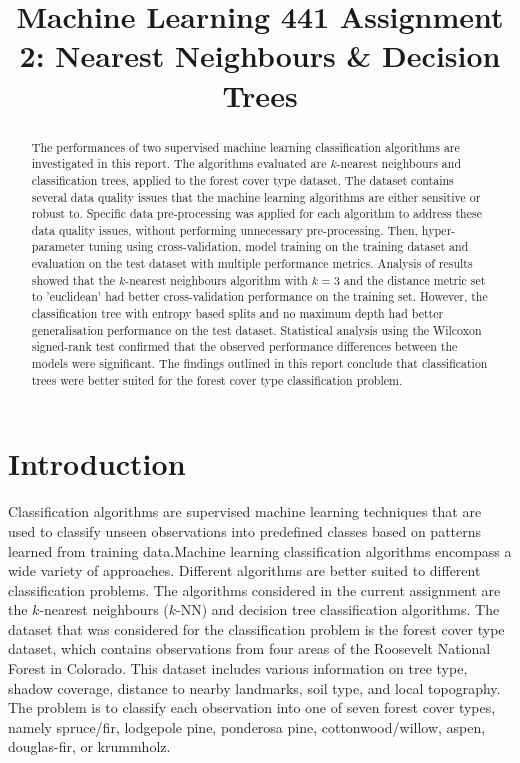 \documentclass[conference]{IEEEtran}
\begin{document}
	
	\title{Machine Learning 441 Assignment 2: Nearest Neighbours \& Decision Trees}
	\author{
	}
	\maketitle
	
	\begin{abstract}
		The performances of two supervised machine learning classification algorithms are investigated in this report. The algorithms evaluated are $k$-nearest neighbours and classification trees, applied to the forest cover type dataset. The dataset contains several data quality issues that the machine learning algorithms are either sensitive or robust to. Specific data pre-processing was applied for each algorithm to address these data quality issues, without performing unnecessary pre-processing. Then, hyper-parameter tuning using cross-validation, model training on the training dataset and evaluation on the test dataset with multiple performance metrics. Analysis of results showed that the $k$-nearest neighbours algorithm with $k=3$ and the distance metric set to 'euclidean' had better cross-validation performance on the training set. However, the classification tree with entropy based splits and no maximum depth had better generalisation performance on the test dataset. Statistical analysis using the Wilcoxon signed-rank test confirmed that the observed performance differences between the models were significant. The findings outlined in this report conclude that classification trees were better suited for the forest cover type classification problem.
	\end{abstract}
	
	\section{Introduction}
	Classification algorithms are supervised machine learning techniques that are used to classify unseen observations into predefined classes based on patterns learned from training data.Machine learning classification algorithms encompass a wide variety of approaches. Different algorithms are better suited to different classification problems. The algorithms considered in the current assignment are the $k$-nearest neighbours ($k$-NN) and decision tree classification algorithms. The dataset that was considered for the classification problem is the forest cover type dataset, which contains observations from four areas of the Roosevelt National Forest in Colorado. This dataset includes various information on tree type, shadow coverage, distance to nearby landmarks, soil type, and local topography. The problem is to classify each observation into one of seven forest cover types, namely spruce/fir, lodgepole pine, ponderosa pine, cottonwood/willow, aspen, douglas-fir, or krummholz.
	
\end{document}
